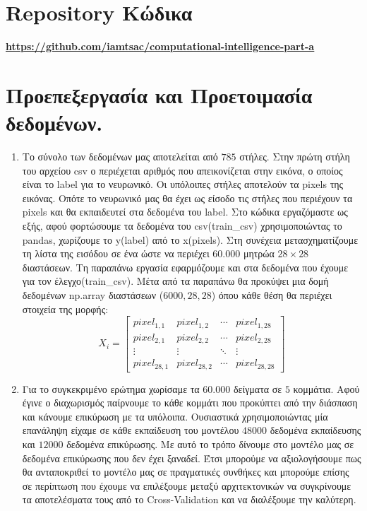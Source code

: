 \documentclass[12pt,a4paper]{article}
\author{Κωνσταντίνος Τσάκωνας \\ Α.Μ.: 1059666}
\date{Ακαδημαϊκό έτος 2020-21\\ Χειμερινό Εξάμηνο}
\newcommand{\tl}{\textlatin}
\newcommand{\gr}{\selectlanguage{greek}}
\begin{document}
    \gr \maketitle \newpage

    \tableofcontents  \newpage

    \section*{\tl{Repository} \gr Κώδικα}
        \underline{\tl{\textbf{\url{https://github.com/iamtsac/computational-intelligence-part-a}}}}

    \section{Προεπεξεργασία και Προετοιμασία δεδομένων.} 
    \begin{enumerate}
        \item 
        Το σύνολο των δεδομένων μας αποτελείται από $785$ στήλες. Στην πρώτη στήλη του αρχείου \tl{csv} ο περιέχεται αριθμός που απεικονίζεται στην εικόνα, ο οποίος είναι το  \tl{label} για το νευρωνικό. Οι υπόλοιπες στήλες αποτελούν τα \tl{pixels} της εικόνας. Οπότε το νευρωνικό μας θα έχει ως είσοδο τις στήλες που περιέχουν τα \tl{pixels} και θα εκπαιδευτεί στα δεδομένα του \tl{label}. Στο κώδικα εργαζόμαστε ως εξής, αφού φορτώσουμε τα δεδομένα του \tl{csv(train\_csv)} χρησιμοποιώντας το pandas, χωρίζουμε το \tl{y(label)} από το \tl{x(pixels)}. Στη συνέχεια μετασχηματίζουμε τη λίστα της εισόδου σε ένα ώστε να περιέχει $60.000$ μητρώα $28\times28$ διαστάσεων. Τη παραπάνω εργασία εφαρμόζουμε και στα δεδομένα που έχουμε για τον έλεγχο(\tl{train\_csv}). Μέτα από τα παραπάνω θα προκύψει μια δομή δεδομένων \tl{np.array} διαστάσεων ($6000,28,28$) όπου κάθε θέση θα περιέχει στοιχεία της μορφής:
        \begin{equation*}
        X_i = 
        \begin{bmatrix}
            pixel_{1,1} & pixel_{1,2} & \cdots & pixel_{1,28} \\
            pixel_{2,1} & pixel_{2,2} & \cdots & pixel_{2,28} \\
            \vdots      & \vdots      & \ddots & \vdots  \\
            pixel_{28,1} & pixel_{28,2} & \cdots & pixel_{28,28} 
        \end{bmatrix} 
        \end{equation*}
        \item Για το συγκεκριμένο ερώτημα χωρίσαμε τα $60.000$ δείγματα σε $5$ κομμάτια. Αφού έγινε ο διαχωρισμός παίρνουμε το κάθε κομμάτι που προκύπτει από την διάσπαση και κάνουμε επικύρωση με τα υπόλοιπα. Ουσιαστικά χρησιμοποιώντας μία επανάληψη είχαμε σε κάθε εκπαίδευση του μοντέλου $48000$ δεδομένα εκπαίδευσης και $12000$ δεδομένα επικύρωσης. Με αυτό το τρόπο δίνουμε στο μοντέλο μας σε δεδομένα επικύρωσης που δεν έχει ξαναδεί. Έτσι μπορούμε να αξιολογήσουμε πως θα ανταποκριθεί το μοντέλο μας σε πραγματικές συνθήκες και μπορούμε επίσης σε περίπτωση που έχουμε να επιλέξουμε μεταξύ αρχιτεκτονικών να συγκρίνουμε τα αποτελέσματα τους από το \tl{Cross-Validation } και να διαλέξουμε την καλύτερη.
    \end{enumerate}
\end{document}
